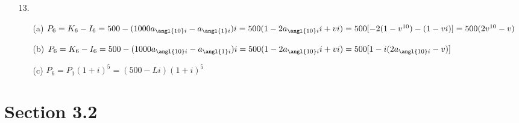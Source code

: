 \documentclass{article}
\begin{document}
\begin{itemize}
\begin{itemize}
	      \end{itemize}
	\item [13.]
	      \begin{itemize}
		      \item [(a)] $P_6=K_6-I_6=500-(1000a_{\angl{10}i}-a_{\angl{1}i})i=500(1-2a_{\angl{10}i}i+vi)=500[-2(1-v^{10})-(1-vi)]=500(2v^{10}-v)$
		      \item [(b)] $P_6=K_6-I_6=500-(1000a_{\angl{10}i}-a_{\angl{1}i})i=500(1-2a_{\angl{10}i}i+vi)=500[1-i(2a_{\angl{10}i}-v)]$
		      \item [(c)] $P_6=P_1(1+i)^5=(500-Li)(1+i)^5$
	      \end{itemize}
\end{itemize}

\section*{Section 3.2}
\end{document}
